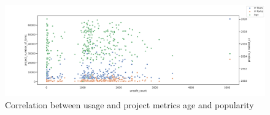 \begin{figure}[htp!]
    \centering
    \includegraphics[width=\textwidth]{assets/plots/chapter4/correlation-popularity.pdf}
    \caption{Correlation between \unsafe{} usage and project metrics age and popularity}
    \label{fig:correlation-popularity}
\end{figure}
